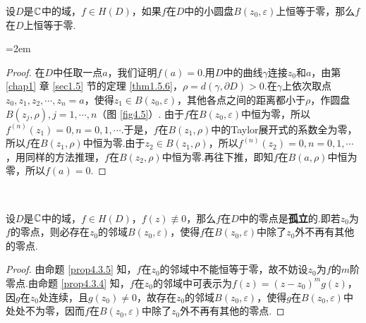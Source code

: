 \begin{prop}\label{prop4.3.5}
  设$D$是$\mathbb C$中的域，$f\in H(D)$，如果$f$在$D$中的小圆盘$B(z_0,\varepsilon)$上恒等于零，那么$f$在$D$上恒等于零.
\end{prop}
\noindent\begin{minipage}{0.65\textwidth}\parindent=2em
\begin{proof}
  在$D$中任取一点$a$，我们证明$f(a)=0$.用$D$中的曲线$\gamma$连接$z_0$和$a$，由第 \ref{chap1} 章 \ref{sec1.5} 节的定理 \ref{thm1.5.6}，$\rho=d(\gamma,\partial D)>0$.在$\gamma$上依次取点$z_0,z_1,z_2,\cdots,z_n=a$，使得$z_1\in B(z_0,\varepsilon)$，其他各点之间的距离都小于$\rho$，作圆盘$B(z_j,\rho),j=1,\cdots,n$（图 \ref{fig4.5}）. 由于$f$在$B(z_0,\varepsilon)$中恒为零，所以$f^{(n)}(z_1)=0,n=0,1,\cdots$.于是，$f$在$B(z_1,\rho)$中的Taylor展开式的系数全为零，所以$f$在$B(z_1,\rho)$中恒为零.由于$z_2\in B(z_1,\rho)$，所以$f^{(n)}(z_2)=0,n=0,1,\cdots$，用同样的方法推理，$f$在$B(z_2,\rho)$中恒为零.再往下推，即知$f$在$B(a,\rho)$中恒为零，所以$f(a)=0$.
\end{proof}
\end{minipage}
\begin{minipage}{0.36\textwidth}
  \centering
\end{minipage}\\[1mm]

\begin{prop}\label{prop4.3.6}
  设$D$是$\mathbb C$中的域，$f\in H(D)$，$f(z)\not\equiv0$，那么$f$在$D$中的零点是\textbf{孤立}的.即若$z_0$为$f$的零点，则必存在$z_0$的邻域$B(z_0,\varepsilon)$，使得$f$在$B(z_0,\varepsilon)$中除了$z_0$外不再有其他的零点.
\end{prop}
\begin{proof}
  由命题 \ref{prop4.3.5} 知，$f$在$z_0$的邻域中不能恒等于零，故不妨设$z_0$为$f$的$m$阶零点.由命题 \ref{prop4.3.4} 知，$f$在$z_0$的邻域中可表示为$f(z)=(z-z_0)^mg(z)$，因$g$在$z_0$处连续，且$g(z_0)\ne0$，故存在$z_0$的邻域$B(z_0,\varepsilon)$，使得$g$在$B(z_0,\varepsilon)$中处处不为零，因而$f$在$B(z_0,\varepsilon)$中除了$z_0$外不再有其他的零点.
\end{proof}


